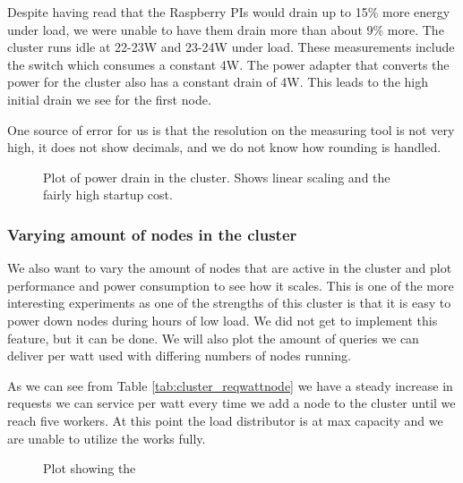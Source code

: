 Despite having read that the Raspberry PIs would drain up to 15\% more energy under load, we were unable to have them drain more than about 9\% more. The cluster runs idle at 22-23W and 23-24W under load. These measurements include the switch which consumes a constant 4W. The power adapter that converts the power for the cluster also has a constant drain of 4W. This leads to the high initial drain we see for the first node.

One source of error for us is that the resolution on the measuring tool is not very high, it does not show decimals, and we do not know how rounding is handled.

\begin{figure}[!h]
\centering
	\caption{Plot of power drain in the cluster. Shows linear scaling and the fairly high startup cost.}
\end{figure}

\subsubsection{Varying amount of nodes in the cluster}
We also want to vary the amount of nodes that are active in the cluster and plot performance and power consumption to see how it scales.
This is one of the more interesting experiments as one of the strengths of this cluster is that it is easy to power down nodes during hours of low load. We did not get to implement this feature, but it can be done. We will also plot the amount of queries we can deliver per watt used with differing numbers of nodes running.

As we can see from Table \ref{tab:cluster_reqwattnode} we have a steady increase in requests we can service per watt every time we add a node to the cluster until we reach five workers. At this point the load distributor is at max capacity and we are unable to utilize the works fully.

\begin{figure}[!h]
\centering
	\caption{Plot showing the }
\end{figure}

